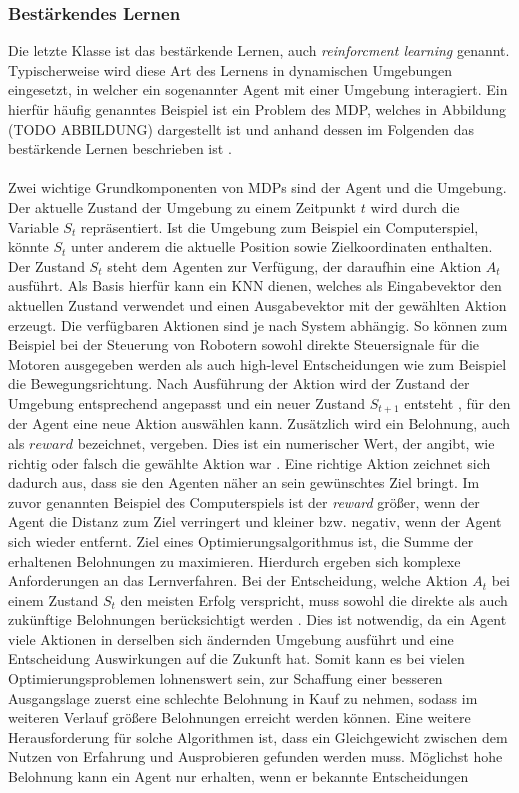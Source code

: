 \subsubsection{Bestärkendes Lernen}
\label{subsubsec:reinforcment_learning}
Die letzte Klasse ist das bestärkende Lernen, auch \emph{reinforcment learning} genannt. Typischerweise wird diese Art des Lernens in dynamischen Umgebungen eingesetzt, in welcher ein sogenannter Agent mit einer Umgebung interagiert. Ein hierfür häufig  genanntes Beispiel ist ein Problem des \ac{MDP}, welches in Abbildung (TODO ABBILDUNG) dargestellt ist und anhand dessen im Folgenden das bestärkende Lernen beschrieben ist \cite{sutton2018reinforcement}. 
\\\\
Zwei wichtige Grundkomponenten von \acp{MDP} sind der Agent und die Umgebung. Der aktuelle Zustand der Umgebung zu einem Zeitpunkt $t$ wird durch die Variable $S_t$ repräsentiert. Ist die Umgebung zum Beispiel ein Computerspiel, könnte $S_t$ unter anderem die aktuelle Position sowie Zielkoordinaten enthalten. Der Zustand $S_t$ steht dem Agenten zur Verfügung, der daraufhin eine Aktion $A_t$ ausführt. Als Basis hierfür kann ein \ac{KNN} dienen, welches als Eingabevektor den aktuellen Zustand verwendet und einen Ausgabevektor mit der gewählten Aktion erzeugt. Die verfügbaren Aktionen sind je nach System abhängig. So können zum Beispiel bei der Steuerung von Robotern sowohl direkte Steuersignale für die Motoren ausgegeben werden als auch high-level Entscheidungen wie zum Beispiel die Bewegungsrichtung. Nach Ausführung der Aktion wird der Zustand der Umgebung entsprechend angepasst und ein neuer Zustand $S_{t+1}$ entsteht \cite{sutton2018reinforcement}, für den der Agent eine neue Aktion auswählen kann. Zusätzlich wird ein Belohnung, auch als $reward$ bezeichnet, vergeben. Dies ist ein numerischer Wert, der angibt, wie richtig oder falsch die gewählte Aktion war \cite{zell2003simulation}. Eine richtige Aktion zeichnet sich dadurch aus, dass sie den Agenten näher an sein gewünschtes Ziel bringt. Im zuvor genannten Beispiel des Computerspiels ist der \emph{reward} größer, wenn der Agent die Distanz zum Ziel verringert und kleiner bzw. negativ, wenn der Agent sich wieder entfernt. Ziel eines Optimierungsalgorithmus ist, die Summe der erhaltenen Belohnungen zu maximieren. Hierdurch ergeben sich komplexe Anforderungen an das Lernverfahren. Bei der Entscheidung, welche Aktion $A_t$ bei einem Zustand $S_t$ den meisten Erfolg verspricht, muss sowohl die direkte als auch zukünftige Belohnungen berücksichtigt werden \cite{sutton2018reinforcement}. Dies ist notwendig, da ein Agent viele Aktionen in derselben sich ändernden Umgebung ausführt und eine Entscheidung Auswirkungen auf die Zukunft hat. Somit kann es bei vielen Optimierungsproblemen  lohnenswert sein, zur Schaffung einer besseren Ausgangslage zuerst eine schlechte Belohnung in Kauf zu nehmen, sodass im weiteren Verlauf größere Belohnungen erreicht werden können. Eine weitere Herausforderung für solche Algorithmen ist, dass ein Gleichgewicht zwischen dem Nutzen von Erfahrung und Ausprobieren gefunden werden muss. Möglichst hohe Belohnung kann ein Agent nur erhalten, wenn er bekannte Entscheidungen 